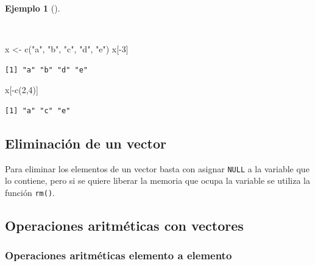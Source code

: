 \documentclass[
  spanish,
  a4paper,
]{scrreport}
\newenvironment{Shaded}{\begin{snugshade}}{\end{snugshade}}
\newcommand{\DecValTok}[1]{\textcolor[rgb]{0.68,0.00,0.00}{#1}}
\newcommand{\FunctionTok}[1]{\textcolor[rgb]{0.28,0.35,0.67}{#1}}
\newcommand{\NormalTok}[1]{\textcolor[rgb]{0.00,0.23,0.31}{#1}}
\newcommand{\OtherTok}[1]{\textcolor[rgb]{0.00,0.23,0.31}{#1}}
\newcommand{\SpecialCharTok}[1]{\textcolor[rgb]{0.37,0.37,0.37}{#1}}
\newcommand{\StringTok}[1]{\textcolor[rgb]{0.13,0.47,0.30}{#1}}
\theoremstyle{definition}
\theoremstyle{definition}
\newtheorem{example}{Ejemplo}[chapter]
\theoremstyle{remark}
\begin{document}
\begin{example}[]\protect\hypertarget{exm-eliminar-elementos-vector}{}\label{exm-eliminar-elementos-vector}

~

\begin{Shaded}
\begin{Highlighting}[]
\NormalTok{x }\OtherTok{\textless{}{-}} \FunctionTok{c}\NormalTok{(}\StringTok{"a"}\NormalTok{, }\StringTok{"b"}\NormalTok{, }\StringTok{"c"}\NormalTok{, }\StringTok{"d"}\NormalTok{, }\StringTok{"e"}\NormalTok{)}
\NormalTok{x[}\SpecialCharTok{{-}}\DecValTok{3}\NormalTok{]}
\end{Highlighting}
\end{Shaded}

\begin{verbatim}
[1] "a" "b" "d" "e"
\end{verbatim}

\begin{Shaded}
\begin{Highlighting}[]
\NormalTok{x[}\SpecialCharTok{{-}}\FunctionTok{c}\NormalTok{(}\DecValTok{2}\NormalTok{,}\DecValTok{4}\NormalTok{)]}
\end{Highlighting}
\end{Shaded}

\begin{verbatim}
[1] "a" "c" "e"
\end{verbatim}

\end{example}

\subsection{Eliminación de un vector}\label{eliminaciuxf3n-de-un-vector}

Para eliminar los elementos de un vector basta con asignar \texttt{NULL}
a la variable que lo contiene, pero si se quiere liberar la memoria que
ocupa la variable se utiliza la función \texttt{rm()}.

\subsection{Operaciones aritméticas con
vectores}\label{operaciones-aritmuxe9ticas-con-vectores}

\subsubsection{Operaciones aritméticas elemento a
elemento}\label{operaciones-aritmuxe9ticas-elemento-a-elemento}
\end{document}
